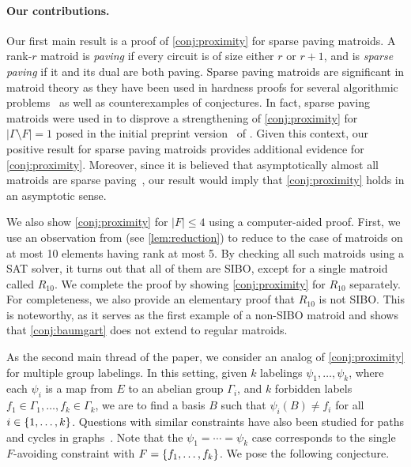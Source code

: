 \documentclass{article}
\DeclarePairedDelimiter{\set}{\{}{\}}
\theoremstyle{definition}
\begin{document}
\paragraph{Our contributions.}
Our first main result is a proof of \cref{conj:proximity} for sparse paving matroids.
A rank-$r$ matroid is \emph{paving} if every circuit is of size either $r$ or $r+1$, and is \emph{sparse paving} if it and its dual are both paving.
Sparse paving matroids are significant in matroid theory as they have been used in hardness proofs for several algorithmic problems~\cite{doronarad2024lower,horsch2024problems_arxiv,jensen1982complexity,lovasz1981matroid} as well as counterexamples of conjectures.
In fact, sparse paving matroids were used in \cite{horsch2024problems} to disprove a strengthening of \cref{conj:proximity} for $|\Gamma \setminus F| = 1$ posed in the initial preprint version~\cite{liu2023congruencyarxiv} of \cite{liu2023congruency}.
Given this context, our positive result for sparse paving matroids provides additional evidence for \cref{conj:proximity}.
Moreover, since it is believed that asymptotically almost all matroids are sparse paving~\cite{mayhew2011on}, our result would imply that \cref{conj:proximity} holds in an asymptotic sense.

We also show \cref{conj:proximity} for $|F| \le 4$ using a computer-aided proof.
First, we use an observation from \cite{horsch2024problems_arxiv} (see \cref{lem:reduction}) to reduce to the case of matroids on at most 10 elements having rank at most 5.
By checking all such matroids using a SAT solver, it turns out that all of them are SIBO, except for a single matroid called $R_{10}$. We complete the proof by showing \cref{conj:proximity} for $R_{10}$ separately. For completeness, we also provide an elementary proof that $R_{10}$ is not SIBO. This is noteworthy, as it serves as the first example of a non-SIBO matroid and shows that \cref{conj:baumgart} does not extend to regular matroids.

As the second main thread of the paper, 
we consider an analog of \cref{conj:proximity} for multiple group labelings.
In this setting, given $k$ labelings $\psi_1, \dotsc, \psi_k$, where each $\psi_i$ is a map from $E$ to an abelian group $\Gamma_i$, and $k$ forbidden labels $f_1 \in \Gamma_1, \dotsc, f_k \in \Gamma_k$, we are to find a basis $B$ such that $\psi_i(B) \ne f_i$ for all $i \in \set{1, \dotsc, k}$.
Questions with similar constraints have also been studied for paths and cycles in graphs~\cite{huynh2019unified,gollin2022unifiederdhosposatheoremcycles,gollin2024unified,chekan2024half}.
Note that the $\psi_1 = \dotsb = \psi_k$ case corresponds to the single $F$-avoiding constraint with $F = \set{f_1, \dotsc, f_k}$.
We pose the following conjecture.
\end{document}
